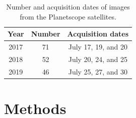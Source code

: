 \documentclass[authoryear,preprint,review,12pt]{elsarticle}
\begin{document}


\begin{table}[ht]
\footnotesize
\caption{Number and acquisition dates of images from the Planetscope satellites.}
\label{table_image_list}
\centering
\begin{tabular}{c  c    c  }	%
\toprule

Year & Number & Acquisition dates  \\
\midrule
2017  & 71 & July 17, 19, and 20  \\
2018  & 52 & July 20, 24, and 25  \\
2019  & 46 & July 25, 27, and 30 \\

\bottomrule
\end{tabular}

\end{table}


\section{Methods}
\label{sec_meth}
\end{document}
